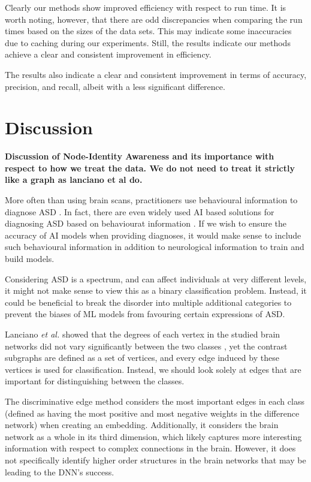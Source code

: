 \documentclass[sigconf]{acmart}
\begin{document}
Clearly our methods show improved efficiency with respect to run time.
It is worth noting, however, that there are odd discrepancies when comparing the run times based on the sizes of the data sets.
This may indicate some inaccuracies due to caching during our experiments.
Still, the results indicate our methods achieve a clear and consistent improvement in efficiency.

The results also indicate a clear and consistent improvement in terms of accuracy, precision, and recall, albeit with a less significant difference.


\section{Discussion}\label{discussion}
\textbf{Discussion of Node-Identity Awareness and its importance with respect to how we treat the data. We do not need to treat it strictly like a graph as lanciano et al do.}

More often than using brain scans, practitioners use behavioural information to diagnose ASD \cite{lord2006, johnson2007, dsm52013}.
In fact, there are even widely used AI based solutions for diagnosing ASD based on behaviourat information \cite{knopf2021}.
If we wish to ensure the accuracy of AI models when providing diagnoses, it would make sense to include such behavioural information in addition to neurological information to train and build models.

Considering ASD is a spectrum, and can affect individuals at very different levels, it might not make sense to view this as a binary classification problem.
Instead, it could be beneficial to break the disorder into multiple additional categories to prevent the biases of ML models from favouring certain expressions of ASD.

Lanciano \emph{et al.} showed that the degrees of each vertex in the studied brain networks did not vary significantly between the two classes \cite{lanciano2020},
yet the contrast subgraphs are defined as a set of vertices, and every edge induced by these vertices is used for classification.
Instead, we should look solely at edges that are important for distinguishing between the classes.

The discriminative edge method considers the most important edges in each class (defined as having the most positive and most negative weights in the difference network) when creating an embedding.
Additionally, it considers the brain network as a whole in its third dimension, which likely captures more interesting information with respect to complex connections in the brain.
However, it does not specifically identify higher order structures in the brain networks that may be leading to the DNN's success.
\end{document}
